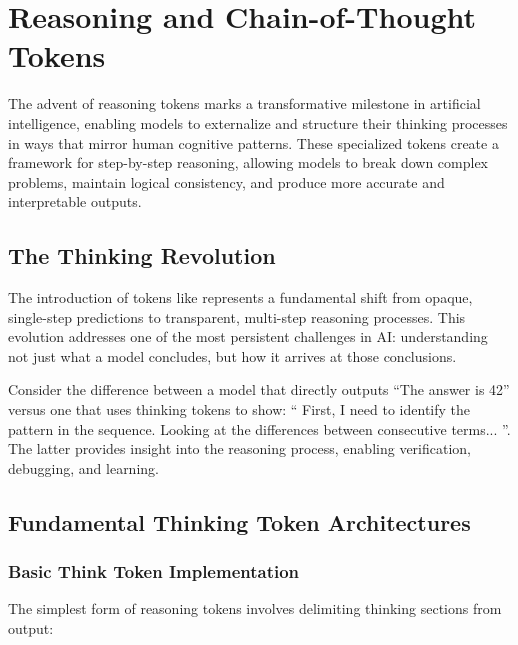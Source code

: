 \section{Reasoning and Chain-of-Thought Tokens}

The advent of reasoning tokens marks a transformative milestone in artificial intelligence, enabling models to externalize and structure their thinking processes in ways that mirror human cognitive patterns. These specialized tokens create a framework for step-by-step reasoning, allowing models to break down complex problems, maintain logical consistency, and produce more accurate and interpretable outputs.

\subsection{The Thinking Revolution}

The introduction of tokens like  represents a fundamental shift from opaque, single-step predictions to transparent, multi-step reasoning processes. This evolution addresses one of the most persistent challenges in AI: understanding not just what a model concludes, but how it arrives at those conclusions.

Consider the difference between a model that directly outputs ``The answer is 42'' versus one that uses thinking tokens to show: `` First, I need to identify the pattern in the sequence. Looking at the differences between consecutive terms... ''. The latter provides insight into the reasoning process, enabling verification, debugging, and learning.

\subsection{Fundamental Thinking Token Architectures}

\subsubsection{Basic Think Token Implementation}

The simplest form of reasoning tokens involves delimiting thinking sections from output:

